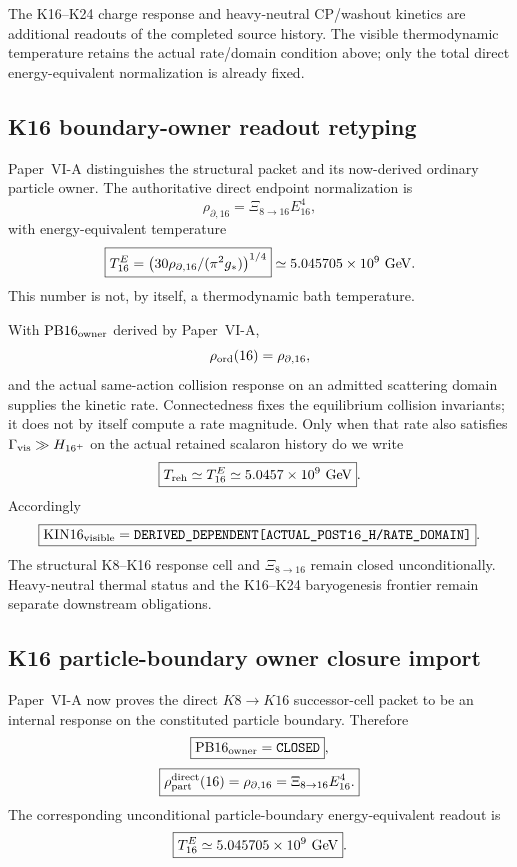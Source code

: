\documentclass[12pt,a4paper]{article}
\begin{document}
The K16--K24 charge response and heavy-neutral CP/washout kinetics are
additional readouts of the completed source history.  The visible
thermodynamic temperature retains the actual rate/domain condition above;
only the total direct energy-equivalent normalization is already fixed.


\subsection{K16 boundary-owner readout retyping}
\label{p9:sec:v1100-k16-owner-readout-retyping}

Paper~VI-A distinguishes the structural packet and its now-derived ordinary
particle owner.  The authoritative direct endpoint normalization is
\[
 \boxed{\rho_{\partial,16}=\Xi_{8\to16}E_{16}^4},
\]
with energy-equivalent temperature
\[
 \boxed{T_{16}^{E}
 =\left(30\rho_{\partial,16}/(\pi^2g_\ast)\right)^{1/4}}
 \simeq5.045705\times10^9\ {\rm GeV}.
\]
This number is not, by itself, a thermodynamic bath temperature.

With $\mathrm{PB16}_{\rm owner}$ derived by Paper~VI-A,
\[
 \rho_{\rm ord}(16)=\rho_{\partial,16},
\]
and the actual same-action collision response on an admitted scattering
domain supplies the kinetic rate.  Connectedness fixes the equilibrium
collision invariants; it does not by itself compute a rate magnitude.
Only when that rate also satisfies $\Gamma_{\rm vis}\gg H_{16^+}$ on the
actual retained scalaron history do we write
\[
 \boxed{T_{\rm reh}\simeq T_{16}^{E}
 \simeq5.0457\times10^9\ {\rm GeV}}.
\]
Accordingly
\[
 \boxed{\mathrm{KIN16}_{\rm visible}
 =\texttt{DERIVED\_DEPENDENT[ACTUAL\_POST16\_H/RATE\_DOMAIN]}}.
\]
The structural K8--K16 response cell and $\Xi_{8\to16}$ remain closed
unconditionally.  Heavy-neutral thermal status and the K16--K24 baryogenesis
frontier remain separate downstream obligations.

\subsection{K16 particle-boundary owner closure import}
\label{p9:sec:v1101-k16-pb16-closure}

Paper~VI-A now proves the direct $K8\to K16$ successor-cell packet to be an
internal response on the constituted particle boundary.  Therefore
\[
 \boxed{\mathrm{PB16}_{\rm owner}=\texttt{CLOSED}},
\]
\[
 \boxed{
 \rho_{\rm part}^{\rm direct}(16)
 =\rho_{\partial,16}
 =\Xi_{8\to16}E_{16}^4.}
\]
The corresponding unconditional particle-boundary energy-equivalent
readout is
\[
 \boxed{T_{16}^{E}\simeq5.045705\times10^9\ {\rm GeV}}.
\]
\end{document}
